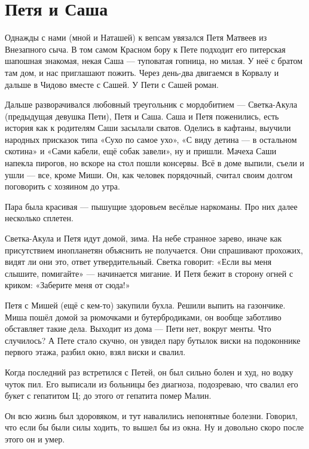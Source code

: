 \documentclass{book}
\begin{document}
\section*{Петя и Саша}

Однажды с нами (мной и Наташей) к вепсам увязался Петя Матвеев из Внезапного сыча.
В том самом Красном бору к Пете подходит его питерская шапошная знакомая, некая Саша ---
туповатая гопница, но милая.
У неё с братом там дом, и нас приглашают пожить.
Через день-два двигаемся в Корвалу и дальше в Чидово вместе с Сашей.
У Пети с Сашей роман.

Дальше разворачивался любовный треугольник с мордобитием --- Светка-Акула (предыдущая девушка Пети), Петя и Саша.
Саша и Петя поженились, есть история как к родителям Саши засылали сватов.
Оделись в кафтаны, выучили народных присказок типа «Сухо по самое ухо», «С виду детина --- в остальном скотина» и «Сами кабели, ещё собак завели», ну и пришли.
Мачеха Саши напекла пирогов, но вскоре на стол пошли консервы.
Всё в доме выпили, съели и ушли --- все, кроме Миши.
Он, как человек порядочный, считал своим долгом поговорить с хозяином до утра.

Пара была красивая --- пышущие здоровьем весёлые наркоманы.
Про них далее несколько сплетен.

 Светка-Акула и Петя идут домой, зима.
На небе странное зарево, иначе как присутствием инопланетян объяснить не получается.
Они спрашивают прохожих, видят ли они это, ответ утвердительный.
Светка говорит: «Если вы меня слышите, помигайте» --- начинается мигание.
И Петя бежит в сторону огней с криком: «Заберите меня от сюда!»

Петя с Мишей (ещё с кем-то) закупили бухла.
Решили выпить на газончике.
Миша пошёл домой за рюмочками и бутербродиками, он вообще заботливо обставляет такие дела.
Выходит из дома --- Пети нет, вокруг менты.
Что случилось?
А Пете стало скучно, он увидел пару бутылок виски на подоконнике первого этажа, разбил окно, взял виски и свалил.

Когда последний раз встретился с Петей, он был сильно болен и худ, но водку чуток пил.
Его выписали из больницы без диагноза, подозреваю, что свалил его букет с гепатитом Ц;
до этого от гепатита помер Малин.

Он всю жизнь был здоровяком, и тут навалились непонятные болезни.
Говорил, что если бы были силы ходить, то вышел бы из окна.
Ну и довольно скоро после этого он и умер.
\end{document}
